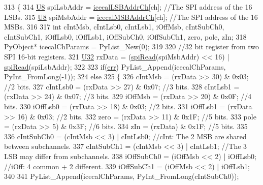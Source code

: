 \begin{DoxyCode}
313 \{                            
314     \hyperlink{ICECALv3_8h_a3cb25ca6f51f003950f9625ff05536fc}{U8} spiLsbAddr = \hyperlink{ICECALv3_8h_abd124f50fa794b9b0aded801fabf5322}{icecalLSBAddrCh}[ch];           \textcolor{comment}{//The SPI address of the 16 LSBs.}
315     \hyperlink{ICECALv3_8h_a3cb25ca6f51f003950f9625ff05536fc}{U8} spiMsbAddr = \hyperlink{ICECALv3_8h_afba64a649cc9314882fd49b62b99d6e7}{icecalMSBAddrCh}[ch];           \textcolor{comment}{//The SPI address of the 16 MSBs.}
316 
317     \textcolor{keywordtype}{int} cIntMsb, cIntLsb0, cIntLsb1, iOffMsb, cIntSubCh0, cIntSubCh1, iOffLsb0, iOffLsb1, iOffSubCh0, 
      iOffSubCh1, zero, pole, zIn;
318     PyObject* icecalChParams = PyList\_New(0);
319 
320     \textcolor{comment}{//32 bit register from two SPI 16-bit registers.}
321     \hyperlink{ICECALv3_8h_a811024d35b9b8a41095b1f583b649e56}{U32} rxData = (\hyperlink{classICECALv3_aced41ce20a0853d6248b8df88412e57a}{spiRead}(spiMsbAddr) << 16) | \hyperlink{classICECALv3_aced41ce20a0853d6248b8df88412e57a}{spiRead}(spiLsbAddr);
322 
323     \textcolor{keywordflow}{if}(\hyperlink{classICECALv3_ad8989925ee5b3ff322d863ce6aaff0bd}{err}) PyList\_Append(icecalChParams, PyInt\_FromLong(-1));
324     \textcolor{keywordflow}{else}
325     \{
326         cIntMsb     = (rxData >> 30) & 0x03;        \textcolor{comment}{//2 bits.}
327         cIntLsb0    = (rxData >> 27) & 0x07;        \textcolor{comment}{//3 bits.}
328         cIntLsb1    = (rxData >> 24) & 0x07;        \textcolor{comment}{//3 bits.}
329         iOffMsb     = (rxData >> 20) & 0x0F;        \textcolor{comment}{//4 bits.}
330         iOffLsb0    = (rxData >> 18) & 0x03;        \textcolor{comment}{//2 bits.}
331         iOffLsb1    = (rxData >> 16) & 0x03;        \textcolor{comment}{//2 bits.}
332         zero            = (rxData >> 11) & 0x1F;        \textcolor{comment}{//5 bits.}
333         pole            = (rxData >> 5)  & 0x3F;        \textcolor{comment}{//6 bits.}
334         zIn             = (rxData)           & 0x1F;        \textcolor{comment}{//5 bits.}
335 
336         cIntSubCh0 = (cIntMsb << 3) | cIntLsb0;     \textcolor{comment}{//cInt: The 2 MSB are shared between subchannels.}
337         cIntSubCh1 = (cIntMsb << 3) | cIntLsb1;     \textcolor{comment}{//The 3 LSB may differ from subchannels.}
338         iOffSubCh0 = (iOffMsb << 2) | iOffLsb0;     \textcolor{comment}{//iOff: 4 common + 2 different.}
339         iOffSubCh1 = (iOffMsb << 2) | iOffLsb1;
340 
341         PyList\_Append(icecalChParams, PyInt\_FromLong(cIntSubCh0));

\end{DoxyCode}
